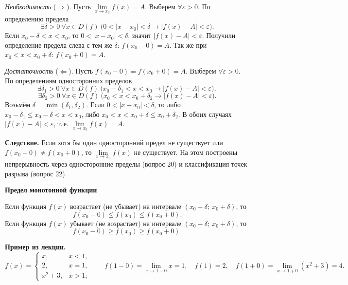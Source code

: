 \documentclass[a4paper,11pt]{article}
\newcommand{\eps}{\varepsilon}
\newcommand{\podr}[1]{\par\needspace{8\baselineskip}\medskip
  {\large\bfseries\textcolor{oprc!80!black}{#1}}\par\nopagebreak\smallskip}
\begin{document}
\begin{dop}
\textit{Необходимость} ($\Rightarrow$). Пусть $\lim\limits_{x \to x_0} f(x) = A$. Выберем $\forall \eps > 0$. По определению предела
\[
  \exists \delta > 0\ \forall x \in D(f)\ \bigl( 0 < |x - x_0| < \delta \to |f(x) - A| < \eps \bigr).
\]
Если $x_0 - \delta < x < x_0$, то $0 < |x - x_0| < \delta$, значит $|f(x) - A| < \eps$. Получили определение предела слева
с тем же $\delta$: $f(x_0 - 0) = A$. Так же при $x_0 < x < x_0 + \delta$: $f(x_0 + 0) = A$.

\textit{Достаточность} ($\Leftarrow$). Пусть $f(x_0 - 0) = f(x_0 + 0) = A$. Выберем $\forall \eps > 0$. По определениям
односторонних пределов
\[
  \exists \delta_1 > 0\ \forall x \in D(f)\ \bigl( x_0 - \delta_1 < x < x_0 \to |f(x) - A| < \eps \bigr),
\]
\[
  \exists \delta_2 > 0\ \forall x \in D(f)\ \bigl( x_0 < x < x_0 + \delta_2 \to |f(x) - A| < \eps \bigr).
\]
Возьмём $\delta = \min(\delta_1, \delta_2)$. Если $0 < |x - x_0| < \delta$, то либо $x_0 - \delta_1 \le x_0 - \delta < x < x_0$,
либо $x_0 < x < x_0 + \delta \le x_0 + \delta_2$. В обоих случаях $|f(x) - A| < \eps$, т.\,е. $\lim\limits_{x \to x_0} f(x) = A$.

\textbf{Следствие.} Если хотя бы один односторонний предел не существует или $f(x_0 - 0) \ne f(x_0 + 0)$, то
$\lim\limits_{x \to x_0} f(x)$ не существует. На этом построены непрерывность через односторонние пределы (вопрос 20)
и классификация точек разрыва (вопрос 22).
\end{dop}

\podr{Предел монотонной функции}

\begin{teo}
Если функция $f(x)$ возрастает (не убывает) на интервале $(x_0 - \delta;\ x_0 + \delta)$, то
\[
  f(x_0 - 0) \le f(x_0) \le f(x_0 + 0).
\]
Если функция $f(x)$ убывает (не возрастает) на интервале $(x_0 - \delta;\ x_0 + \delta)$, то
\[
  f(x_0 - 0) \ge f(x_0) \ge f(x_0 + 0).
\]
\end{teo}

\textbf{Пример из лекции.}
\[
  f(x) =
  \begin{cases}
    x, & x < 1,\\
    2, & x = 1,\\
    x^2 + 3, & x > 1;
  \end{cases}
  \qquad
  f(1 - 0) = \lim_{x \to 1 - 0} x = 1, \quad f(1) = 2, \quad
  f(1 + 0) = \lim_{x \to 1 + 0} (x^2 + 3) = 4.
\]
\end{document}
